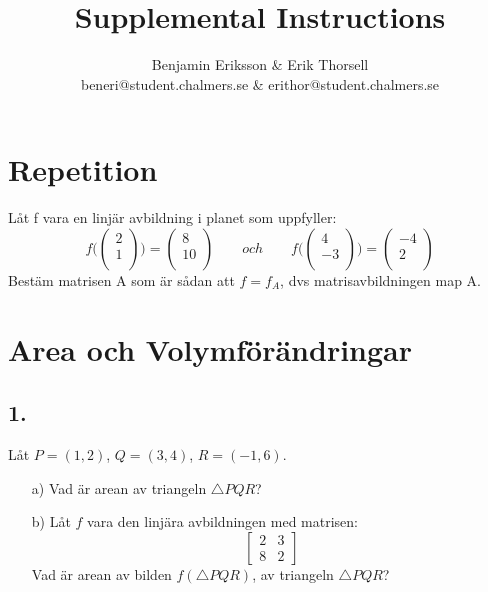 \documentclass{article}
\title{Supplemental Instructions}
\author{Benjamin Eriksson \& Erik Thorsell \\ 
		\small{beneri@student.chalmers.se} \&
		\small{erithor@student.chalmers.se}
}
\date{
     }
\begin{document}
\maketitle


\section*{Repetition}
Låt f vara en linjär avbildning i planet som uppfyller:
\[
	f \bigg (  
    \begin{pmatrix}
    2		\\
    1		\\
    \end{pmatrix}  
	\bigg )   
	= 
	\begin{pmatrix}
    8		\\
    10		\\
    \end{pmatrix}    
    \qquad 
	och
	\qquad
    f \bigg (  
    \begin{pmatrix}
    4		\\
    -3		\\
    \end{pmatrix}  
	\bigg )   
	= 
	\begin{pmatrix}
    -4		\\
    2		\\
    \end{pmatrix}   	
\]
Bestäm matrisen A som är sådan att $f = f_A$, dvs matrisavbildningen map A.

\section*{Area och Volymförändringar}
\subsection*{1.}
Låt $P=(1,2)$, $Q=(3,4)$, $R=(-1,6)$.
\begin{itemize}
    \item[a) ] Vad är arean av triangeln $\bigtriangleup PQR$?
    \item[b) ] Låt $f$ vara den linjära avbildningen med matrisen: 
               $$\begin{bmatrix}
               2  & 3 \\
               8  & 2
               \end{bmatrix}$$
               Vad är arean av bilden $f(\bigtriangleup PQR)$, av triangeln 
               $\bigtriangleup PQR$?
\end{itemize}
\end{document}
